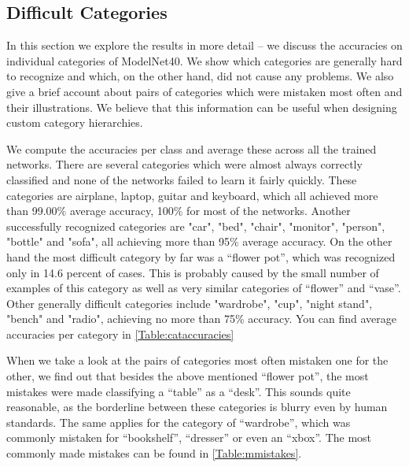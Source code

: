 \subsection{Difficult Categories}
In this section we explore the results in more detail -- we discuss the accuracies on individual categories of ModelNet40. We show which categories are generally hard to recognize and which, on the other hand, did not cause any problems. We also give a brief account about pairs of categories which were mistaken most often and their illustrations. We believe that this information can be useful when designing custom category hierarchies. \par
We compute the accuracies per class and average these across all the trained networks. There are several categories which were almost always correctly classified and none of the networks failed to learn it fairly quickly. These categories are airplane, laptop, guitar and keyboard, which all achieved more than 99.00\% average accuracy, 100\% for most of the networks. Another successfully recognized categories are "car", "bed", "chair", "monitor", "person", "bottle" and "sofa", all achieving more than 95\% average accuracy.  
On the other hand the most difficult category by far was a “flower pot”, which was recognized only in 14.6 percent of cases. This is probably caused by the small number of examples of this category as well as very similar categories of “flower” and “vase”. Other generally difficult categories include "wardrobe", "cup", "night stand", "bench" and "radio", achieving no more than 75\% accuracy. You can find average accuracies per category in \autoref{Table:cataccuracies} \par



When we take a look at the pairs of categories most often mistaken one for the other, we find out that besides the above mentioned “flower pot”, the most mistakes were made classifying a “table” as a “desk”. This sounds quite reasonable, as the borderline between these categories is blurry even by human standards. The same applies for the category of “wardrobe”, which was commonly mistaken for “bookshelf”, “dresser” or even an “xbox”. The most commonly made mistakes can be found in \autoref{Table:mmistakes}.




